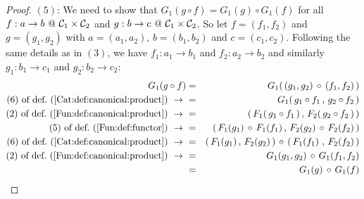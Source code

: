 \begin{proof}
    $(5)$: We need to show that $G_{1}(g\circ f)=G_{1}(g)\circ G_{1}(f)$ 
    for all $f:a\to b\ @\ \mbox{${\cal C}_{1}$}\times\mbox{${\cal C}_{2}$}$ and $g:b\to c\ @\ \mbox{${\cal C}_{1}$}\times\mbox{${\cal C}_{2}$}$.
    So let $f=(f_{1},f_{2})$ and $g=(g_{1},g_{2})$ with $a=(a_{1},a_{2})$, 
    $b=(b_{1},b_{2})$ and $c=(c_{1},c_{2})$. Following the same details as
    in $(3)$, we have $f_{1}:a_{1}\to b_{1}$ and $f_{2}:a_{2}\to b_{2}$ and
    similarly $g_{1}:b_{1}\to c_{1}$ and $g_{2}:b_{2}\to c_{2}$:
        \begin{eqnarray*}G_{1}(g\circ f)
            &=&G_{1}(\,(g_{1},g_{2})\,\circ\,(f_{1},f_{2})\,)\\
            \mbox{$(6)$ of def.~(\ref{Cat:def:canonical:product})}\ \to\ 
            &=&G_{1}(\,g_{1}\circ f_{1}\,,\,g_{2}\circ f_{2}\,)\\
            \mbox{$(2)$ of def.~(\ref{Fun:def:canonical:product})}\ \to\ 
            &=&(\,F_{1}(\,g_{1}\circ f_{1}\,)\,,\,F_{2}(\,g_{2}\circ f_{2}\,)\,)\\
            \mbox{$(5)$ of def.~(\ref{Fun:def:functor})}\ \to\ 
            &=&(\,F_{1}(g_{1})\,\circ\, F_{1}(f_{1})\,,\,F_{2}(g_{2})\,
                \circ\, F_{2}(f_{2})\,)\\
            \mbox{$(6)$ of def.~(\ref{Cat:def:canonical:product})}\ \to\ 
            &=&(\,F_{1}(g_{1})\,,\,F_{2}(g_{2})\,)\,\circ\,(\,F_{1}(f_{1})\,
                \,,\,F_{2}(f_{2})\,)\\
            \mbox{$(2)$ of def.~(\ref{Fun:def:canonical:product})}\ \to\ 
            &=&G_{1}(g_{1},g_{2})\,\circ\,G_{1}(f_{1},f_{2})\\
            &=&G_{1}(g)\,\circ\,G_{1}(f)
        \end{eqnarray*}
\end{proof}
